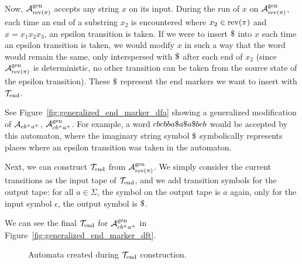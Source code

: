 Now, $\mathcal{A}^{\text{gen}}_{\text{rev(}\pi\text{)}}$ accepts any string $x$ on its input.
During the run of $x$ on $\mathcal{A}^{\text{gen}}_{\text{rev(}\pi\text{)}}$, each time an end of a substring $x_2$ is encountered where $x_2 \in \text{rev(}\pi\text{)}$ and $x = x_1 x_2 x_3$, an epsilon transition is taken.
If we were to insert $\marker$ into $x$ each time an epsilon transition is taken, we would modify $x$ in such a way that the word would remain the same, only interspersed with $\marker$ after each end of $x_2$ (since $\mathcal{A}^{\text{gen}}_{\text{rev(}\pi\text{)}}$ is deterministic, no other transition can be taken from the source state of the epsilon transition).
These $\marker$ represent the end markers we want to insert with $\mathcal{T}_{\text{end}}$.

See Figure~\ref{fig:generalized_end_marker_dfa} showing a generalized modification of \dfa $\mathcal{A}_{cb^+a^+}$, $\mathcal{A}^{\text{gen}}_{cb^+a^+}$.
For example, a word $cbcbba\$ a\$ a\$ bcb$ would be accepted by this automaton, where the imaginary string symbol $\marker$ symbolically represents places where an epsilon transition was taken in the automaton.


Next, we can construct $\mathcal{T}_{\text{end}}$ from $\mathcal{A}^{\text{gen}}_{\text{rev(}\pi\text{)}}$.
We simply consider the current transitions as the input tape of $\mathcal{T}_{\text{end}}$,
and we add transition symbols for the output tape: for all $a \in \Sigma$, the symbol on the output tape is $a$ again, only for the input symbol $\epsilon$, the output symbol is $\marker$.

We can see the final $\mathcal{T}_{\text{end}}$ for $\mathcal{A}^{\text{gen}}_{cb^+a^+}$ in Figure~\ref{fig:generalized_end_marker_dft}.
\begin{figure}[ht]
    \centering
    \quad
    \quad
    \caption{
      Automata created during $\mathcal{T}_{\text{end}}$ construction.
    }
    \label{fig:end_marker_auts}%
\end{figure}

